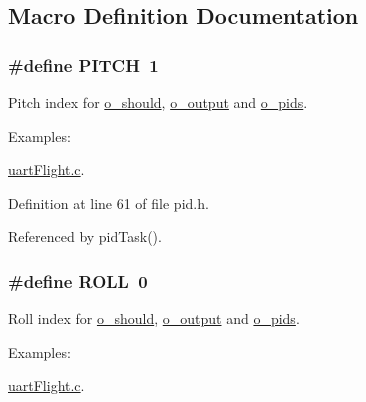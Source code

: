 \subsection{Macro Definition Documentation}
\hypertarget{group__pid_gacd633835a520a62245ec6cfeb6d00e97}{
\subsubsection[{P\-I\-T\-C\-H}]{\setlength{\rightskip}{0pt plus 5cm}\#define P\-I\-T\-C\-H~1}}\label{group__pid_gacd633835a520a62245ec6cfeb6d00e97}


Pitch index for \hyperlink{group__pid_ga3e9b95260c17d0da155fb4eede660d03}{o\-\_\-should}, \hyperlink{group__pid_gaf457b38bb75f72a89bac9b4a9570bd99}{o\-\_\-output} and \hyperlink{group__pid_gaf8f428e17178b1f15edba7158fd831da}{o\-\_\-pids}. 

\begin{Desc}
\item[Examples\-: ]\par
\hyperlink{uart_flight_8c-example}{uart\-Flight.\-c}.\end{Desc}


Definition at line 61 of file pid.\-h.



Referenced by pid\-Task().

\hypertarget{group__pid_gaf902416f65138704a180dbae2dc9d8f2}{
\subsubsection[{R\-O\-L\-L}]{\setlength{\rightskip}{0pt plus 5cm}\#define R\-O\-L\-L~0}}\label{group__pid_gaf902416f65138704a180dbae2dc9d8f2}


Roll index for \hyperlink{group__pid_ga3e9b95260c17d0da155fb4eede660d03}{o\-\_\-should}, \hyperlink{group__pid_gaf457b38bb75f72a89bac9b4a9570bd99}{o\-\_\-output} and \hyperlink{group__pid_gaf8f428e17178b1f15edba7158fd831da}{o\-\_\-pids}. 

\begin{Desc}
\item[Examples\-: ]\par
\hyperlink{uart_flight_8c-example}{uart\-Flight.\-c}.\end{Desc}


